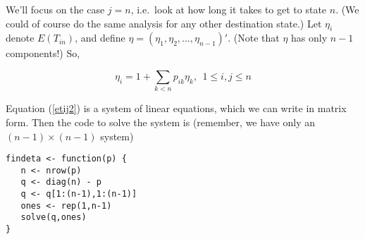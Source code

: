 We'll focus on the case $j = n$, i.e.\ look at how long it takes to get
to state $n$.  (We could of course do the same analysis for any other
destination state.)
Let $\eta_{i}$ denote $E(T_{in})$, and define  $\eta =
(\eta_1,\eta_2,...,\eta_{n-1})'$.  (Note that $\eta$ has only $n-1$
components!)  So,

\begin{equation}
\label{etij2}
\eta_{i}
= 1 + \sum_{k < n} p_{ik} \eta_k, ~~
1 \leq i,j \leq n
\end{equation}

Equation (\ref{etij2}) is a system of linear equations, which we can
write in matrix form.  Then the code to solve the system is
(remember, we have only an $(n-1) \times (n-1)$ system)

\begin{lstlisting}                                                              
findeta <- function(p) {                                                        
   n <- nrow(p)                                                                 
   q <- diag(n) - p                                                             
   q <- q[1:(n-1),1:(n-1)]                                                      
   ones <- rep(1,n-1)                                                           
   solve(q,ones)                                                                
}                                                                               
\end{lstlisting}                        

